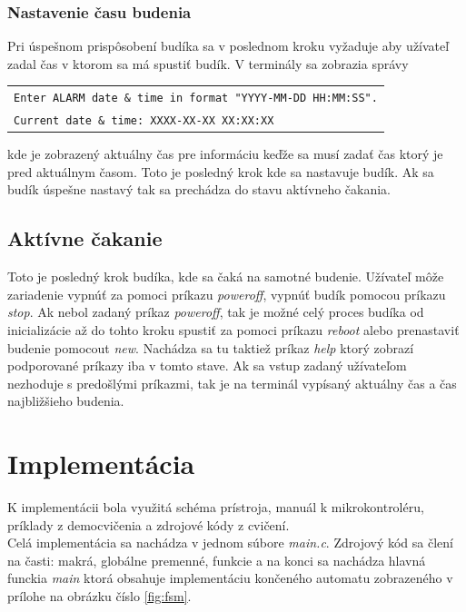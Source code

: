 \documentclass[11pt,a4paper]{article}
\begin{document}
        \subsubsection{Nastavenie času budenia}

            \indent Pri úspešnom prispôsobení budíka sa v poslednom kroku vyžaduje aby užívateľ zadal čas v ktorom sa má spustiť budík. V terminály sa zobrazia správy
            \begin{center}
                \begin{tabular}{l}
                    \texttt{Enter ALARM date \& time in format "YYYY-MM-DD HH:MM:SS".}\\
                    \texttt{Current date \& time: XXXX-XX-XX XX:XX:XX}
                \end{tabular}
            \end{center}
            kde je zobrazený aktuálny čas pre informáciu keďže sa musí zadať čas ktorý je pred aktuálnym časom. Toto je posledný krok kde sa nastavuje budík. Ak sa budík úspešne nastavý tak sa prechádza do stavu aktívneho čakania.

        \subsection{Aktívne čakanie}

            \indent Toto je posledný krok budíka, kde sa čaká na samotné budenie. Užívateľ môže zariadenie vypnúť za pomoci príkazu \textit{poweroff}, vypnúť budík pomocou príkazu \textit{stop}. Ak nebol zadaný príkaz \textit{poweroff}, tak je možné celý proces budíka od inicializácie až do tohto kroku spustiť za pomoci príkazu \textit{reboot} alebo prenastaviť budenie pomocout \textit{new}. Nachádza sa tu taktiež príkaz \textit{help} ktorý zobrazí podporované príkazy iba v tomto stave. Ak sa vstup zadaný užívateľom nezhoduje s predošlými príkazmi, tak je na terminál vypísaný aktuálny čas a čas najbližšieho budenia.


\section{Implementácia}

    \indent K implementácii bola využitá schéma prístroja\cite{SCHEME}, manuál k mikrokontroléru\cite{MANUAL}, príklady z democvičenia a zdrojové kódy z cvičení.\\

    \indent Celá implementácia sa nachádza v jednom súbore \textit{main.c}. Zdrojový kód sa člení na časti: makrá, globálne premenné, funkcie a na konci sa nachádza hlavná funckia \textit{main} ktorá obsahuje implementáciu končeného automatu zobrazeného v prílohe na obrázku číslo \ref{fig:fsm}.\\
\end{document}
